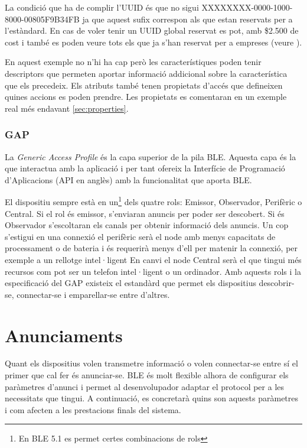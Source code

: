 La condició que ha de complir l'UUID és que no sigui XXXXXXXX-0000-1000-8000-00805F9B34FB ja que aquest sufix correspon als que estan reservats per a l'estàndard.
En cas de voler tenir un UUID global reservat es pot, amb \$2.500 de cost i també es poden veure tots els que ja s'han reservat per a empreses (veure \cite{reservedUUIDs}).

En aquest exemple no n'hi ha cap però les característiques poden tenir descriptors \cite{descriptors} que permeten aportar informació addicional sobre la característica que els precedeix.
Els atributs també tenen propietats d'accés que defineixen quines accions es poden prendre.
Les propietats es comentaran en un exemple real més endavant \ref{sec:properties}.

\subsubsection{GAP}
La \textit{Generic Access Profile} és la capa superior de la pila BLE.
Aquesta capa és la que interactua amb la aplicació i per tant ofereix la Interfície de Programació d'Aplicacions (API en anglès) amb la funcionalitat que aporta BLE.

El dispositiu sempre està en un\footnote{En BLE 5.1 es permet certes combinacions de rols} dels quatre rols: Emissor, Observador, Perifèric o Central.
Si el rol és emissor, s'enviaran anuncis per poder ser descobert.
Si és Observador s'escoltaran els canals per obtenir informació dels anuncis.
Un cop s'estigui en una connexió el perifèric serà el node amb menys capacitats de processament o de bateria i és requerirà menys d'ell per matenir la connexió, per exemple a un rellotge intel·ligent
En canvi el node Central serà el que tingui més recursos com pot ser un telefon intel·ligent o un ordinador.
Amb aquests rols i la especificació del GAP existeix el estandàrd que permet els dispositius descobrir-se, connectar-se  i emparellar-se entre d'altres.


\section{Anunciaments}
Quant els dispositius volen transmetre informació o volen connectar-se entre sí el primer que cal fer és anunciar-se.
BLE és molt flexible alhora de configurar els paràmetres d'anunci i permet al desenvolupador adaptar el protocol per a les necessitats que tingui.
A continuació, es concretarà quins son aquests paràmetres i com afecten a les prestacions finals del sistema.

